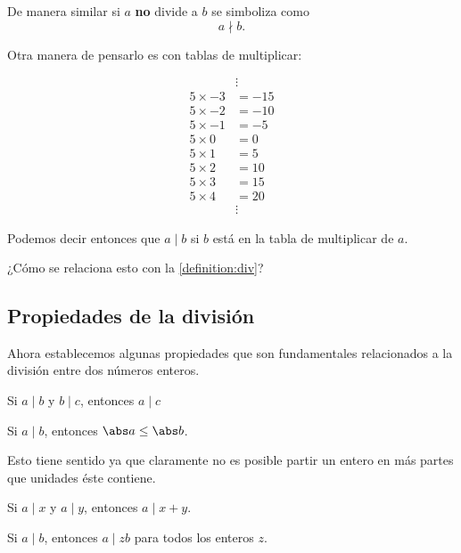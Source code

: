 De manera similar si $a$ \textbf{no}
divide a $b$ se simboliza como
\[a \nmid b.\]

Otra manera de pensarlo es
con tablas de multiplicar:

\begin{align*}
	            & \vdots \\
	5 \times -3 & = -15  \\
	5 \times -2 & = -10  \\
	5 \times -1 & = -5   \\
	5 \times 0  & = 0    \\
	5 \times 1  & = 5    \\
	5 \times 2  & = 10   \\
	5 \times 3  & = 15   \\
	5 \times 4  & = 20   \\
	            & \vdots
\end{align*}

Podemos decir entonces que
$a \mid b$ si $b$ está en la
tabla de multiplicar de $a$.

\begin{question*}
	¿Cómo se relaciona esto con
	la \autoref{definition:div}?
\end{question*}

\subsection{Propiedades de la división}
Ahora establecemos algunas propiedades
que son fundamentales relacionados a
la división entre dos números enteros.

\begin{proposition}
	\label{proposition:transitivitydiv}
	Si $a \mid b$ y $b \mid c$, entonces $a \mid c$
\end{proposition}

\begin{proposition}
	Si $a \mid b$, entonces $\abs a \leq \abs b$.
\end{proposition}

Esto tiene sentido ya que
claramente no es posible partir un
entero en más partes que unidades éste
contiene.

\begin{proposition}
	\label{proposition:sumdiv}
	Si $a \mid x$ y $a \mid y$, entonces
	$a \mid x + y$.
\end{proposition}

\begin{proposition}
	Si $a \mid b$, entonces $a \mid zb$
	para todos los enteros $z$.
\end{proposition}

